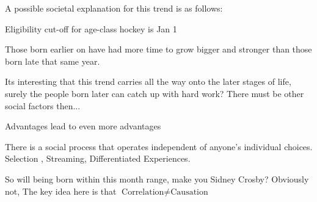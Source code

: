 A possible societal explanation for this trend is as follows:
\begin{bullets}
	\item Eligibility cut-off for age-class hockey is Jan 1
	\item Those born earlier on have had more time to grow bigger and stronger than those born late that same year.
\end{bullets}

Its interesting that this trend carries all the way onto the later stages of life, surely the people born later can catch up with hard work? There must be other social factors then...
\begin{bullets}
	\item Advantages lead to even more advantages
	\item There is a social process that operates independent of anyone's individual choices. Selection , Streaming, Differentiated Experiences.
\end{bullets}
So will being born within this month range, make you Sidney Crosby? Obviously not, The key idea here is that $\text{Correlation}\neq\text{Causation}$
